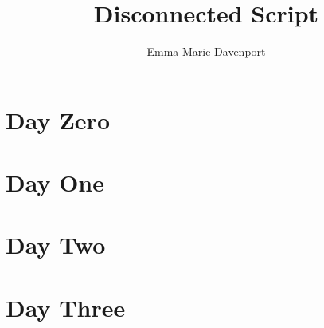 \documentclass[12pt, a4paper]{article}
\author{Emma Marie Davenport}
\title{Disconnected Script}
\begin{document}
	\maketitle
	
	\section{Day Zero}
	
	\section{Day One}
	
	\section{Day Two}
	
	\section{Day Three}
\end{document}
